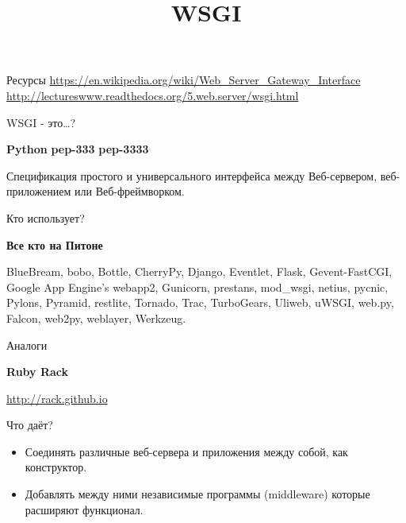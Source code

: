 
\usepackage{array}      %

\title{WSGI}



\frame{\titlepage}

\begin{frame}{Ресурсы}
    \url{https://en.wikipedia.org/wiki/Web_Server_Gateway_Interface}\newline
    \url{http://lectureswww.readthedocs.org/5.web.server/wsgi.html}
\end{frame}

\begin{frame}{WSGI - это\ldots?}

    \textbf{Python}\newline
    \textbf{pep-333}\newline
    \textbf{pep-3333}\newline

    Спецификация простого и универсального интерфейса между Веб-сервером,
    веб-приложением или Веб-фреймворком.

\end{frame}

\begin{frame}{Кто использует?}

    \textbf{Все кто на Питоне}

    BlueBream, bobo, Bottle, CherryPy, Django, Eventlet, Flask, Gevent-FastCGI,
    Google App Engine's webapp2, Gunicorn, prestans, mod\_wsgi, netius, pycnic,
    Pylons, Pyramid, restlite, Tornado, Trac, TurboGears, Uliweb, uWSGI,
    web.py, Falcon, web2py, weblayer, Werkzeug.

\end{frame}

\begin{frame}{Аналоги}

    \textbf{Ruby Rack}\newline

    \url{http://rack.github.io}

\end{frame}

\begin{frame}{Что даёт?}

    \begin{itemize}
        \item Соединять различные веб-сервера и приложения между
            собой, как конструктор.
        \item Добавлять между ними независимые программы
            (middleware) которые расширяют функционал.
    \end{itemize}

\end{frame}

